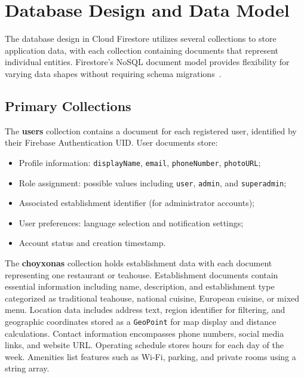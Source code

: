 \section{Database Design and Data Model}
\label{sec:database}

The database design in Cloud Firestore utilizes several collections to store application data, with each collection containing documents that represent individual entities.
Firestore's NoSQL document model provides flexibility for varying data shapes without requiring schema migrations~\cite{firebase_firestore2024}.

\subsection{Primary Collections}
\label{subsec:collections}

The \textbf{users} collection contains a document for each registered user, identified by their Firebase Authentication UID.
User documents store:
\begin{itemize}
  \item Profile information: \texttt{displayName}, \texttt{email}, \texttt{phoneNumber}, \texttt{photoURL};
  \item Role assignment: possible values including \texttt{user}, \texttt{admin}, and \texttt{superadmin};
  \item Associated establishment identifier (for administrator accounts);
  \item User preferences: language selection and notification settings;
  \item Account status and creation timestamp.
\end{itemize}

The \textbf{choyxonas} collection holds establishment data with each document representing one restaurant or teahouse.
Establishment documents contain essential information including name, description, and establishment type categorized as traditional teahouse, national cuisine, European cuisine, or mixed menu.
Location data includes address text, region identifier for filtering, and geographic coordinates stored as a \texttt{GeoPoint} for map display and distance calculations.
Contact information encompasses phone numbers, social media links, and website URL.
Operating schedule stores hours for each day of the week.
Amenities list features such as Wi-Fi, parking, and private rooms using a string array.

